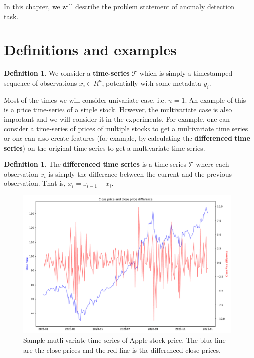 \documentclass[a4paper, twoside]{report}
\theoremstyle{definition}
\newtheorem{definition}[theorem]{Definition}
\numberwithin{equation}{section}
\begin{document}
In this chapter, we will describe the problem statement of anomaly detection task.

\section{Definitions and examples}

\begin{definition}
    We consider a \textbf{time-series} $\mathcal{T}$ which is simply a timestamped sequence of observations $x_i \in R^n$,
    potentially with some metadata $y_i$.
\end{definition}

Most of the times we will consider univariate case, i.e. $n=1$.
An example of this is a price time-series of a single stock.
However, the multivariate case is also important and we will consider it in the experiments.
For example, one can consider a time-series of prices of multiple stocks to get a multivariate time series or
one can also create features (for example, by calculating the \textbf{differenced time series})
on the original time-series to get a multivariate time-series.

\begin{definition}
    The \textbf{differenced time series} is a time-series $\mathcal{T}$ where each observation $x_i$ is simply the difference
    between the current and the previous observation.
    That is, $x_i=x_{i-1}-x_i$.
\end{definition}

\begin{figure}[h!]
    \centering
    \includegraphics[width=\textwidth]{etc/apple_time_series.pdf}
    \caption{Sample mutli-variate time-series of Apple stock price. The blue line are the close prices
        and the red line is the differenced close prices.}
    \label{fig:apple_time_series}
\end{figure}
\end{document}
